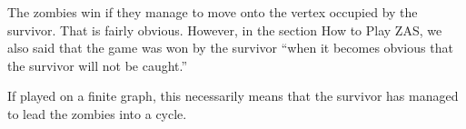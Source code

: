 
The zombies win if they manage to move onto the vertex occupied by the survivor. That is fairly obvious. 
However, in the section How to Play ZAS, we also said that the game was won by the survivor ``when it becomes obvious that the survivor will not be caught.''

If played on a finite graph, this necessarily means that the survivor has managed to lead
the zombies into a cycle.
